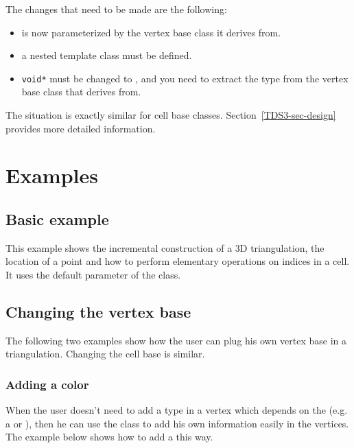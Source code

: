 The changes that need to be made are the following:
\begin{itemize}
\item{}  is now parameterized by the vertex base class it
        derives from.
\item{} a nested template class  must be defined.
\item{} \texttt{void*} must be changed to , and you need to
	extract the  type from the vertex base class that
         derives from.
\end{itemize}

The situation is exactly similar for cell base classes.
Section~\ref{TDS3-sec-design} provides more detailed information.

\section{Examples}
\label{Triangulation3-sec-examples}
\subsection{Basic example}
This example shows the incremental construction of a 3D triangulation, the
location of a point and how to perform elementary operations on indices in a
cell. It uses the default parameter of the  class.


\subsection{Changing the vertex base}
The following two examples show how the user can plug his own vertex base in a
triangulation.  Changing the cell base is similar.

\subsubsection{Adding a color}
\label{Triangulation3-sec-examples-color}
When the user doesn't need to add a type in a vertex which depends on the
 (e.g. a  or
), then he can use the
 class to add his own information
easily in the vertices.  The example below shows how to add a 
this way.


